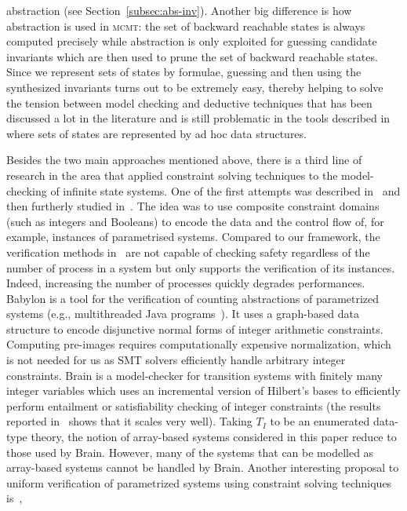 \documentclass{LMCS}
\theoremstyle{plain}\newtheorem{assumption}[thm]{Assumption}
\theoremstyle{plain}\newtheorem{proposition}[thm]{Proposition}
\theoremstyle{plain}\newtheorem{property}[thm]{Property}
\theoremstyle{plain}\newtheorem{example}[thm]{Example}
\theoremstyle{plain}\newtheorem{claim}[thm]{Claim}
\theoremstyle{plain}\newtheorem{lemma}[thm]{Lemma}
\begin{document}
abstraction (see Section~\ref{subsec:abs-inv}).  Another big
difference is how abstraction is used in \textsc{mcmt}: the set of
backward reachable states is always computed precisely while
abstraction is only exploited for guessing candidate invariants which
are then used to prune the set of backward reachable states.  Since we
represent sets of states by formulae, guessing and then using the synthesized invariants turns out
to be extremely easy, thereby helping to solve the tension between
model checking and deductive techniques that has been discussed a lot
in the literature and is still problematic in the tools described
in~\cite{tacas06,cav06}
where sets of states are represented by ad hoc data structures.

Besides the two main approaches mentioned above, there is a third line
of research in the area that applied constraint solving techniques to
the model-checking of infinite state systems.  One of the first
attempts was described in~\cite{bultan-gerber-pugh} and then furtherly
studied in~\cite{composite-mc}.  The idea was to use composite
constraint domains (such as integers and Booleans) to encode the data
and the control flow of, for example, instances of parametrised
systems.  Compared to our framework, the verification methods
in~\cite{bultan-gerber-pugh,composite-mc} are not capable of checking
safety regardless of the number of process in a system but only
supports the verification of its instances.  Indeed, increasing the
number of processes quickly degrades performances.  Babylon is a tool
for the verification of counting abstractions of parametrized systems
(e.g., multithreaded Java programs~\cite{babylon}). It uses a
graph-based data structure to encode disjunctive normal forms of
integer arithmetic constraints.  Computing pre-images requires
computationally expensive normalization, which is not needed for us as
SMT solvers efficiently handle arbitrary integer constraints.  Brain
is a model-checker for transition systems with finitely many integer
variables which uses an incremental version of Hilbert's bases to
efficiently perform entailment or satisfiability checking of integer
constraints (the results reported in~\cite{voronkov-cav02} shows that
it scales very well).  Taking $T_I$ to be an enumerated data-type
theory, the notion of array-based systems considered in this paper
reduce to those used by Brain.  However, many of the systems that can
be modelled as array-based systems cannot be handled by Brain.
Another interesting proposal to uniform verification of parametrized
systems using constraint solving techniques is~\cite{bouajjani-rew},
\end{document}
